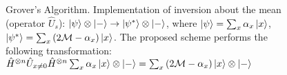 \begin{figure}
\centering



\caption{Grover's Algorithm. Implementation of inversion about
  the mean (operator $\hat{U}_s$): $\left|\psi\right>\otimes\ket{-} \rightarrow
  \left|\psi^{\ast}\right>\otimes\ket{-}$, where
$\left|\psi\right> = \sum_x \alpha_x \ket{ x }$, 
$\left|\psi^{\ast}\right> = \sum_x \left( 2 \mathcal{M} -  \alpha_x \right)
  \ket{ x }$. 
The proposed scheme performs the following transformation: 
$\hat{H}^{\otimes n}\hat{U}_{x \ne 0}\hat{H}^{\otimes n} \sum_x
  \alpha_x \ket{ x } \otimes \left| - \right > = 
\sum_x \left( 2 \mathcal{M} -  \alpha_x \right) \ket{ x }
\otimes \left| - \right >
$
} 
\label{figQuantCompGroverMeanInvImpl}
\end{figure}